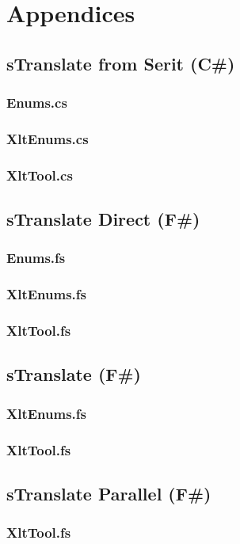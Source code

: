 \documentclass[12pt, a4paper]{article}
\begin{document}
\section{Appendices}	
\subsection{sTranslate from Serit (C\#)}
\subsubsection{Enums.cs}

\newpage
\subsubsection{XltEnums.cs}

\newpage
\subsubsection{XltTool.cs}


\newpage
\subsection{sTranslate Direct (F\#)}
\subsubsection{Enums.fs}

\newpage
\subsubsection{XltEnums.fs}

\newpage
\subsubsection{XltTool.fs}


\newpage
\subsection{sTranslate (F\#)}
\subsubsection{XltEnums.fs}

\newpage
\subsubsection{XltTool.fs}


\newpage
\subsection{sTranslate Parallel (F\#)}
\subsubsection{XltTool.fs}

\end{document}
